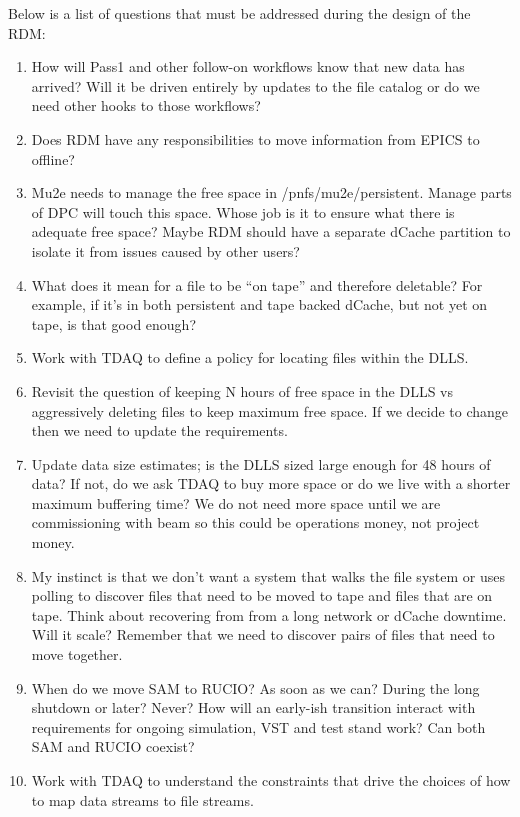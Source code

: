 Below is a list of questions that must be addressed during the design of the RDM:

\begin{enumerate}
\item How will Pass1 and other follow-on workflows know that new data has arrived?
  Will it be driven entirely by updates to the file catalog or do we need other
  hooks to those workflows?
\item Does RDM have any responsibilities to move information from EPICS to offline?
\item Mu2e needs to manage the free space in /pnfs/mu2e/persistent. Manage parts of DPC will touch this space.
  Whose job is it to ensure what there is adequate free space? Maybe RDM should have a separate dCache
  partition to isolate it from issues caused by other users?
\item What does it mean for a file to be ``on tape'' and therefore deletable?
  For example, if it's in both persistent and tape backed dCache, but not yet on tape, is that good enough?
\item Work with TDAQ to define a policy for locating files within the DLLS.
\item Revisit the question of keeping N hours of free space in the DLLS vs aggressively deleting files to keep
  maximum free space.  If we decide to change then we need to update the requirements.
\item Update data size estimates;  is the DLLS sized large enough for 48 hours of data?
  If not, do we ask TDAQ to buy more space or do we live with a shorter maximum buffering time?
  We do not need more space until we are commissioning with beam so this could be operations money, not project money.
\item My instinct is that we don't want a system that walks the file system or uses polling to discover files that need to be moved to tape
  and files that are on tape.
  Think about recovering from from a long network or dCache downtime.  Will it scale?
  Remember that we need to discover pairs of files that need to move together.
\item   When do we move SAM to RUCIO? As soon as we can? During the long shutdown or later?  Never?
  How will an early-ish transition interact with requirements for ongoing simulation, VST and test stand work?
  Can both SAM and RUCIO coexist?
\item Work with TDAQ to understand the constraints that drive the choices of how to
  map data streams to file streams.
  \begin{enumerate}

\end{enumerate}
\end{enumerate}
